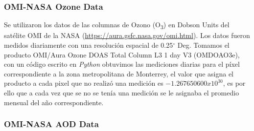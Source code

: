 \subsubsection{OMI-NASA Ozone Data}
Se utilizaron los datos de las columnas de Ozono (O\textsubscript{3}) en Dobson Units del satélite OMI de la NASA (\url{https://aura.gsfc.nasa.gov/omi.html}). Los datos fueron medidos diariamente con una resolución espacial de 0.25$^{\circ}$ Deg. Tomamos el producto OMI/Aura Ozone DOAS Total Column L3 1 day V3 (OMDOAO3e), con un código escrito en \textit{Python} obtuvimos las mediciones diarias para el píxel correspondiente a la zona metropolitana de Monterrey, el valor que asigna el producto a cada pixel que no realizó una medición es $-1.267650600x10^{30}$, es por ello que a cada vez que se no se tenía una medición se le asignaba el promedio mensual del año correspondiente.
\subsubsection{OMI-NASA AOD Data}